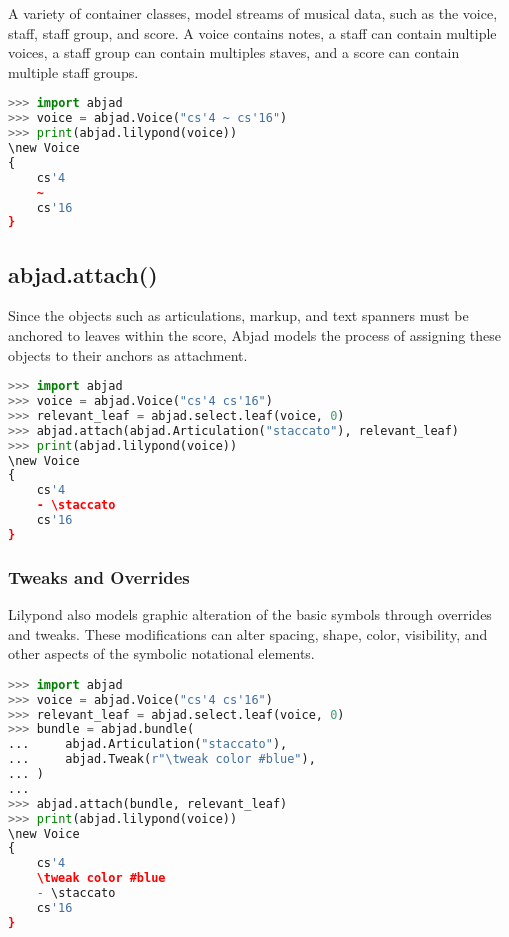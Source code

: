 A variety of container classes, model streams of musical data, such as the voice, staff, staff group, and score. A voice contains notes, a staff can contain multiple voices, a staff group can contain multiples staves, and a score can contain multiple staff groups.

\begin{lstlisting}[language=Python,frame=tb,caption={Abjad containers},label=lst:containers]
>>> import abjad
>>> voice = abjad.Voice("cs'4 ~ cs'16")
>>> print(abjad.lilypond(voice))
\new Voice
{
    cs'4
    ~
    cs'16
}
\end{lstlisting}

\subsection{abjad.attach()}

Since the objects such as articulations, markup, and text spanners must be anchored to leaves within the score, Abjad models the process of assigning these objects to their anchors as attachment.

\begin{lstlisting}[language=Python,frame=tb,caption={Abjad attachments},label=lst:attachments]
>>> import abjad
>>> voice = abjad.Voice("cs'4 cs'16")
>>> relevant_leaf = abjad.select.leaf(voice, 0)
>>> abjad.attach(abjad.Articulation("staccato"), relevant_leaf)
>>> print(abjad.lilypond(voice))
\new Voice
{
    cs'4
    - \staccato
    cs'16
}
\end{lstlisting}

\subsubsection{Tweaks and Overrides}

Lilypond also models graphic alteration of the basic symbols through overrides and tweaks. These modifications can alter spacing, shape, color, visibility, and other aspects of the symbolic notational elements.

\begin{lstlisting}[language=Python,frame=tb,caption={Abjad tweaks},label=lst:tweaks]
>>> import abjad
>>> voice = abjad.Voice("cs'4 cs'16")
>>> relevant_leaf = abjad.select.leaf(voice, 0)
>>> bundle = abjad.bundle(
...     abjad.Articulation("staccato"),
...     abjad.Tweak(r"\tweak color #blue"),
... )
... 
>>> abjad.attach(bundle, relevant_leaf)
>>> print(abjad.lilypond(voice))
\new Voice
{
    cs'4
    \tweak color #blue
    - \staccato
    cs'16
}
\end{lstlisting}



